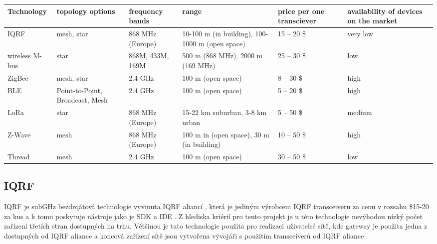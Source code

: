 \begin{table}[]
  \begin{tabular}{|p{1.5cm}||p{2cm}|p{2cm}|p{2cm}|p{2cm}|p{2cm}|}
  \hline
  Technology    & topology options                & frequency bands  & range                                           & price per one transciever & availability of devices on the market \\ \hline \hline
  IQRF           & mesh, star                      & 868 MHz (Europe) & 10-100 m (in building), 100-1000 m (open space) & 15 – 20 \$                & very low                              \\ \hline
  wireless M-bus & star                            & 868M, 433M, 169M & 500 m (868 MHz), 2000 m (169 MHz)               & 25 – 30 \$                & low                                   \\ \hline
  ZigBee         & mesh, star                      & 2.4 GHz          & 100 m (open space)                              & 8 – 30 \$                 & high                                  \\ \hline
  BLE            & Point-to-Point, Broadcast, Mesh & 2.4 GHz          & 100 m (open space)                              & 5 – 20 \$                 & high                                  \\ \hline
  LoRa           & star                            & 868 MHz (Europe) & 15-22 km suburban, 3-8 km urban                 & 5 – 50 \$                 & medium                                \\ \hline
  Z-Wave         & mesh                            & 868 MHz (Europe) & 100 m in (open space), 30 m (in building)       & 10 – 50 \$                & high                                  \\ \hline
  Thread         & mesh                            & 2.4 GHz          & 100 m (open space)                              & 30 – 50 \$                & low                                   \\ \hline
  \end{tabular}
\end{table}

\subsection{IQRF}
IQRF je subGHz bezdrqátová technologie vyvinuta IQRF aliancí \cite{iqrf_alliance}, která je jediným výrobcem IQRF transceiveru \cite{iqrf_transceivers} za cenu v rozsahu \$15-20 za kus a k tomu poskytuje nástroje jako je SDK \cite{iqrf_sdk} a IDE \cite{iqrf_ide}. Z hlediska kriérií pro tento projekt je u této technologie nevýhodou nízký počet zařízení třetích stran dostupných na trhu. 
Většinou je tato technologie použita pro realizaci uživatelsé sítě, kde gateway je použita jedna z dostupných od IQRF aliance a koncová zařízení sítě jsou vytvořena vývojáři s použitím transceiverů od IQRF aliance
\cite{paper_iqrf}.


